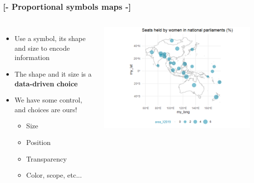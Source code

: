 \documentclass[xcolor=x11names,compress]{beamer}
\renewcommand{\(}{\begin{columns}}
\renewcommand{\)}{\end{columns}}
\newcommand{\<}[1]{\begin{column}{#1}}
\renewcommand{\>}{\end{column}}
\begin{document}
\begin{frame} %
\frametitle{\textcolor{brique}{[-  \textbf{Proportional symbols maps} -]}}
  \begin{columns}
    \begin{itemize}[<+-|alert@+>]
        \item Use a symbol, its shape and size to encode information
        \item The shape and it size is a \textbf{data-driven choice}
        \item We have some control, and choices are ours!
            \begin{itemize}[<+-|alert@+>]
                \item  Size
                \item  Position
                \item  Transparency
                \item  Color, scope, etc...  %
            \end{itemize}
        \end{itemize}
        \includegraphics[width = 1.0\textwidth]{ShareWomenParliamentSymb-Small.png}
    \end{columns}    
\end{frame}
\end{document}
